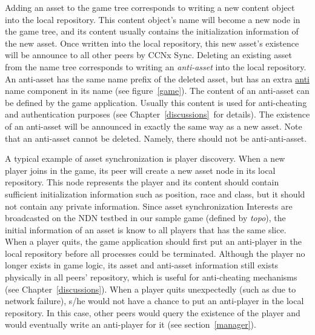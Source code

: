 Adding an asset to the game tree corresponds to writing a new content object into the local repository. This content object's name will become a new node in the game tree, and its content usually contains the initialization information of the new asset. Once written into the local repository, this new asset's existence will be announce to all other peers by CCNx Sync. Deleting an existing asset from the name tree corresponds to writing an \emph{anti-asset} into the local repository. An anti-asset has the same name prefix of the deleted asset, but has an extra \url{anti} name component in its name (see figure~\ref{game}). The content of an anti-asset can be defined by the game application. Usually this content is used for anti-cheating and authentication purposes (see Chapter~\ref{discussions}~for details). The existence of an anti-asset will be announced in exactly the same way as a new asset. Note that an anti-asset cannot be deleted. Namely, there should not be anti-anti-asset. 

A typical example of asset synchronization is player discovery. When a new player joins in the game, its peer will create a new asset node in its local repository. This node represents the player and its content should contain sufficient initialization information such as position, race and class, but it should not contain any private information. Since asset synchronization Interests are broadcasted on the NDN testbed in our sample game (defined by \emph{topo}), the initial information of an asset is know to all players that has the same slice. When a player quits, the game application should first put an anti-player in the local repository before all processes could be terminated. Although the player no longer exists in game logic, its asset and anti-asset information still exists physically in all peers' repository, which is useful for anti-cheating mechanisms (see Chapter~\ref{discussions}). When a player quits unexpectedly (such as due to network failure), s/he would not have a chance to put an anti-player in the local repository. In this case, other peers would query the existence of the player and would eventually write an anti-player for it (see section~\ref{manager}).

